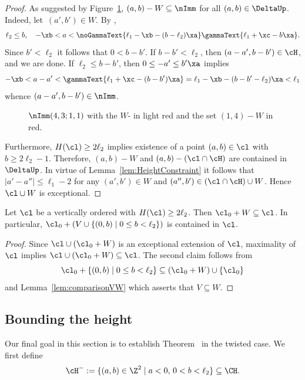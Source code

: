 \begin{proof}
As suggested by 
Figure~\ref{fig:WBoxTriangle}, 
$(a,b)-W\subseteq\nImm$ for all 
$(a,b)\in\DeltaUp$. Indeed, let~$(a',b')\in W$. 
By ,
$$
\ell_2\leq b,\quad-\xb<a<
\noGammaText{\ell_1-\xb-(b-\ell_2)\xa}
\gammaText{\ell_1 + \xc -b\xa}.
$$
Since $b'<\ell_2$ it follows that $0<b-b'$. 
If $b-b'<\ell_2$, then $(a-a',b-b')\in\cH$, 
and we are done. If $\ell_2\leq b-b'$, then 
$0\leq-a'\leq b'\xa$ 
implies 
$$
-\xb<a-a'<
\gammaText{\ell_1+\xc-(b-b')\xa}
=\ell_1-\xb-(b-b'-\ell_2)\xa<\ell_1
$$
whence $(a-a',b-b')\in\nImm$.

\begin{figure}[ht]
\caption{$\nImm(4,3;1,1)$ with the $W$-{\wbox} in 
light red and the set $(1,4)-W$ in red.}
\label{fig:WBoxTriangle}
\end{figure}

Furthermore, $H(\cl)\geq2\ell_2$ implies 
existence of a point $(a,b)\in\cl$ with 
${b\geq2\ell_2-1}$. Therefore, $(a,b)-W$ and
$(a,b)-(\cl\cap\cH)$ are contained in 
$\DeltaUp$. In virtue of 
Lemma~\ref{lem:HeightConstraint} 
it follows that $|a'-a''|\leq\ell_1-2$ 
for any $(a',b')\in W$ and $(a'',b')\in(\cl\cap\cH)\cup W$. 
Hence $\cl\cup W$ is exceptional.
\end{proof}

\begin{coro}\label{cor:WBox}
Let $\cl$ be a vertically ordered {\mes} with 
$H(\cl)\geq2\ell_2$. Then $\cl_0+W\subseteq\cl$. 
In particular, $\cl_0+(V\cup\{(0,b)\mid0\leq b<\ell_2\})$
is contained in $\cl$.
\end{coro}

\begin{proof}
Since $\cl\cup(\cl_0+W)$ is an exceptional extension 
of $\cl$, maximality of $\cl$ implies 
$\cl\cup(\cl_0+W)\subseteq\cl$. The second claim 
follows from
$$
\cl_0+\{(0,b)\mid0\leq b<\ell_2\}\subseteq
(\cl_0+W)\cup\{\cl_0\}
$$
and Lemma~\ref{lem:comparisonVW} which asserts that 
$V\subseteq W$.
\end{proof}

\subsection{Bounding the height}
\label{subsec:BoundHeight}
Our final goal in this section is to establish 
Theorem~{\thHeight} in the twisted case. We first define
$$
\cH^-:=\{(a,b)\in\Z^2\mid a<0,\,0<b<\ell_2\}\subseteq\CH.
$$

